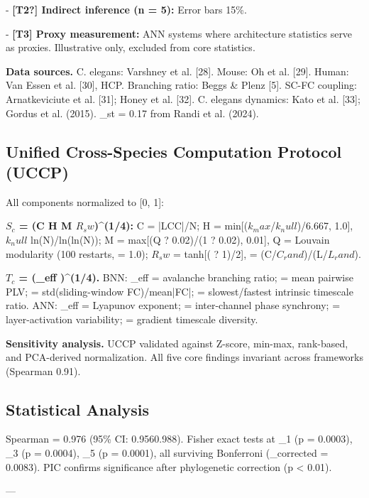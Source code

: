\documentclass[a4paper,12pt]{article}
\begin{document}
- \textbf{[T2?] Indirect inference (n = 5):} Error bars 15\%.

- \textbf{[T3] Proxy measurement:} ANN systems where architecture statistics serve as proxies. Illustrative only, excluded from core statistics.


\textbf{Data sources.} C. elegans: Varshney et al. [28]. Mouse: Oh et al. [29]. Human: Van Essen et al. [30], HCP. Branching ratio: Beggs \& Plenz [5]. SC-FC coupling: Arnatkeviciute et al. [31]; Honey et al. [32]. C. elegans dynamics: Kato et al. [33]; Gordus et al. (2015). _st = 0.17 from Randi et al. (2024).


\subsection{Unified Cross-Species Computation Protocol (UCCP)}

All components normalized to [0, 1]:


\textbf{$S_c$ = (C  H  M  $R_sw$)^(1/4):} C = |LCC|/N; H = min[($k_max$/$k_null$)/6.667, 1.0], $k_null$  ln(N)/ln(ln(N)); M = max[(Q ? 0.02)/(1 ? 0.02), 0.01], Q = Louvain modularity (100 restarts,  = 1.0); $R_sw$ = tanh[( ? 1)/2],  = (C/$C_rand$)/(L/$L_rand$).


\textbf{$T_c$ = (_eff      )^(1/4).} BNN: _eff = avalanche branching ratio;  = mean pairwise PLV;  = std(sliding-window FC)/mean|FC|;  = slowest/fastest intrinsic timescale ratio. ANN: _eff = Lyapunov exponent;  = inter-channel phase synchrony;  = layer-activation variability;  = gradient timescale diversity.


\textbf{Sensitivity analysis.} UCCP validated against Z-score, min-max, rank-based, and PCA-derived normalization. All five core findings invariant across frameworks (Spearman   0.91).


\subsection{Statistical Analysis}

Spearman  = 0.976 (95\% CI: 0.9560.988). Fisher exact tests at _1 (p = 0.0003), _3 (p = 0.0004), _5 (p = 0.0001), all surviving Bonferroni (_corrected = 0.0083). PIC confirms significance after phylogenetic correction (p < 0.01).



---
\end{document}
